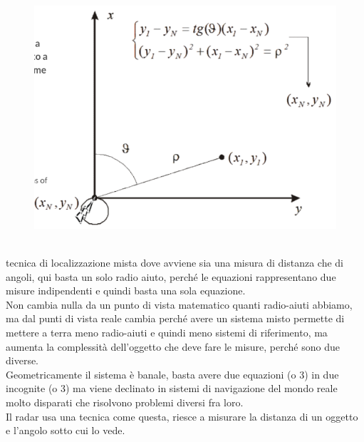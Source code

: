 \documentclass[oneside, 12pt]{extbook}
\begin{document}
\begin{figure}[!h]
	\includegraphics[scale=0.3]{immagini/localization/mixed_mes.png}
\end{figure}\\
tecnica di localizzazione mista dove avviene sia una misura di distanza che di angoli, qui basta un solo radio aiuto, perché le equazioni rappresentano due misure indipendenti e quindi basta una sola equazione.\\
Non cambia nulla da un punto di vista matematico quanti radio-aiuti abbiamo, ma dal punti di vista reale cambia perché avere un sistema misto permette di mettere a terra meno radio-aiuti e quindi meno sistemi di riferimento, ma aumenta la complessità dell'oggetto che deve fare le misure, perché sono due diverse.\\
Geometricamente il sistema è banale, basta avere due equazioni (o 3) in due incognite (o 3) ma viene declinato in sistemi di navigazione del mondo reale molto disparati che risolvono problemi diversi fra loro.\\
Il radar usa una tecnica come questa, riesce a misurare la distanza di un oggetto e l'angolo sotto cui lo vede.
\end{document}
